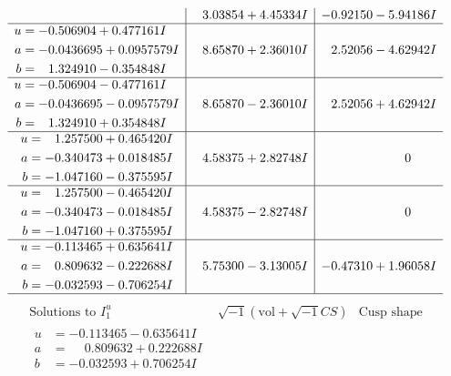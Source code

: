 \documentclass[1p]{elsarticle_modified}
\theoremstyle{definition}
\newcommand{\I}{\sqrt{-1}}
\begin{document}
$$\begin{array}{c|c|c}
 & \phantom{-}3.03854 + 4.45334 I & -0.92150 - 5.94186 I \\ \hline\begin{aligned}
u &= -0.506904 + 0.477161 I \\
a &= -0.0436695 + 0.0957579 I \\
b &= \phantom{-}1.324910 - 0.354848 I\end{aligned}
 & \phantom{-}8.65870 + 2.36010 I & \phantom{-}2.52056 - 4.62942 I \\ \hline\begin{aligned}
u &= -0.506904 - 0.477161 I \\
a &= -0.0436695 - 0.0957579 I \\
b &= \phantom{-}1.324910 + 0.354848 I\end{aligned}
 & \phantom{-}8.65870 - 2.36010 I & \phantom{-}2.52056 + 4.62942 I \\ \hline\begin{aligned}
u &= \phantom{-}1.257500 + 0.465420 I \\
a &= -0.340473 + 0.018485 I \\
b &= -1.047160 - 0.375595 I\end{aligned}
 & \phantom{-}4.58375 + 2.82748 I & \phantom{-0.000000 } 0 \\ \hline\begin{aligned}
u &= \phantom{-}1.257500 - 0.465420 I \\
a &= -0.340473 - 0.018485 I \\
b &= -1.047160 + 0.375595 I\end{aligned}
 & \phantom{-}4.58375 - 2.82748 I & \phantom{-0.000000 } 0 \\ \hline\begin{aligned}
u &= -0.113465 + 0.635641 I \\
a &= \phantom{-}0.809632 - 0.222688 I \\
b &= -0.032593 - 0.706254 I\end{aligned}
 & \phantom{-}5.75300 - 3.13005 I & -0.47310 + 1.96058 I\\
 \hline 
 \end{array}$$\newpage$$\begin{array}{c|c|c}  
\text{Solutions to }I^u_{1}& \I (\text{vol} + \sqrt{-1}CS) & \text{Cusp shape}\\
 \hline 
\begin{aligned}
u &= -0.113465 - 0.635641 I \\
a &= \phantom{-}0.809632 + 0.222688 I \\
b &= -0.032593 + 0.706254 I\end{aligned}

\end{array}$$
\end{document}
